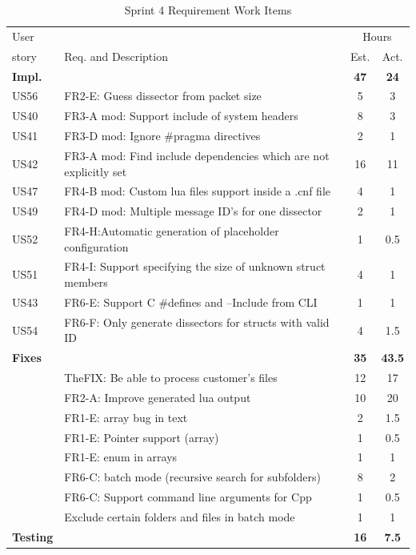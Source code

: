 \begin{table}[htbp] \small \center
\caption{Sprint 4 Requirement Work Items \label{tab:sprint4req}}
\begin{tabularx}{\textwidth}{l X c c}
	\toprule
	User & & \multicolumn{2}{c}{Hours} \\
	\cmidrule(r){3-4}
	story & Req. and Description & Est. & Act. \\
	\midrule
	\textbf{Impl.} &  & \textbf{47} & \textbf{24} \\
	US56 & FR2-E: Guess \gls{dissector} from \gls{packet} size & 5 & 3 \\
 	US40 & FR3-A mod: Support \gls{include} of system \glspl{header} &  8  & 3 \\
	US41 & FR3-D mod: Ignore \#pragma directives & 2 & 1 \\
	US42 & FR3-A mod: Find include dependencies which are not explicitly set & 16  & 11 \\
	US47 & FR4-B mod: Custom \Gls{lua} files support inside a .cnf file & 4 & 1 \\
	US49 & FR4-D mod: Multiple message ID's for one \gls{dissector} & 2 & 1 \\
	US52 & FR4-H:Automatic generation of placeholder configuration & 1  & 0.5\\
	US51 & FR4-I: Support specifying the size of unknown struct members & 4 & 1 \\
	US43 & FR6-E: Support C \#defines and --Include from CLI & 1 & 1 \\
	US54 & FR6-F: Only generate dissectors for structs with valid ID & 4 & 1.5 \\
	\addlinespace
	\textbf{Fixes} &  & \textbf{35} & \textbf{43.5} \\
	& TheFIX: Be able to process customer's files & 12 & 17 \\
	 & FR2-A: Improve generated \Gls{lua} output & 10 & 20 \\
	 & FR1-E: \Gls{array} bug in text & 2 & 1.5 \\
	 & FR1-E: Pointer support (array) & 1 & 0.5 \\
	 & FR1-E: \Gls{enum} in \glspl{array} & 1 & 1 \\		
	 & FR6-C: \Gls{batch mode} (recursive search for subfolders) &  8  & 2 \\
	 & FR6-C: Support command line arguments for Cpp & 1 & 0.5\\
	 & Exclude certain folders and files in batch mode & 1 & 1 \\
	\addlinespace
	\textbf{Testing} &  & \textbf{16} & \textbf{7.5} \\

\end{tabularx}
\end{table}
